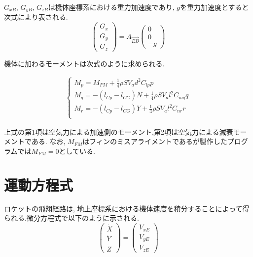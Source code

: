 \documentclass[a4paper]{jarticle}
\begin{document}
\(G_{xB}\), \(G_{yB}\), \(G_{zB}\)は機体座標系における重力加速度であり, \(g\)を重力加速度とすると次式により表される.
\begin{equation}
  \left(
    \begin{array}{ccc}
      G_x \\
      G_y \\
      G_z
    \end{array}
  \right) = A_{\overrightarrow{EB}}
  \left(
    \begin{array}{ccc}
      0 \\
      0 \\
      -g
    \end{array}
  \right)
\end{equation}

機体に加わるモーメントは次式のように求められる.

\begin{eqnarray}
  \begin{cases}
    M_p = M_{FM} + \frac{1}{4} \rho S V_a d^2 C_{lp} p \\%
    M_q = -(l_{Cp}-l_{CG})N + \frac{1}{4} \rho S V_a l^2 C_{mq} q \\%
    M_r = -(l_{Cp}-l_{CG})Y + \frac{1}{4} \rho S V_a l^2 C_{nr} r \\%
  \end{cases}
\end{eqnarray}

上式の第1項は空気力による加速側のモーメント,第2項は空気力による減衰モーメントである.
なお, \(M_{FM}\)はフィンのミスアライメントであるが製作したプログラムでは\(M_{FM} = 0\)としている.

\section{運動方程式}
ロケットの飛翔経路は, 地上座標系における機体速度を積分することによって得られる.微分方程式で以下のように示される.　 
\begin{equation}
\left(
  \begin{array}{ccc}
    \dot X \\
    \dot Y \\
    \dot Z 
  \end{array}
\right)=
\left(
  \begin{array}{ccc}
    V_{xE} \\
    V_{yE} \\
    V_{zE}  
  \end{array}
\right)
\end{equation}
\end{document}
